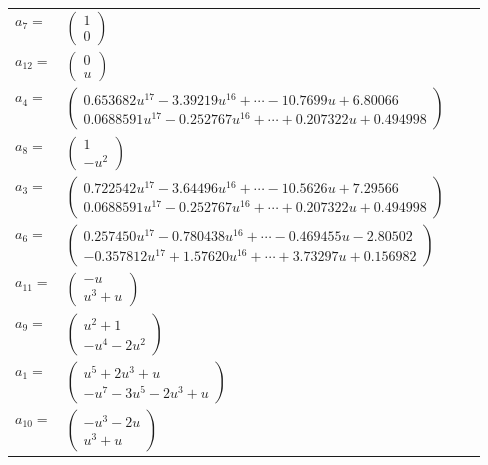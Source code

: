 \documentclass[1p]{elsarticle_modified}
\theoremstyle{definition}
\begin{document}
\begin{tabular}{m{7pt} m{180pt} m{7pt} m{180pt} }
\flushright $a_{7}=$&$\begin{pmatrix}1\\0\end{pmatrix}$ \\
\flushright $a_{12}=$&$\begin{pmatrix}0\\u\end{pmatrix}$ \\
\flushright $a_{4}=$&$\begin{pmatrix}0.653682 u^{17}-3.39219 u^{16}+\cdots-10.7699 u+6.80066\\0.0688591 u^{17}-0.252767 u^{16}+\cdots+0.207322 u+0.494998\end{pmatrix}$ \\
\flushright $a_{8}=$&$\begin{pmatrix}1\\- u^2\end{pmatrix}$ \\
\flushright $a_{3}=$&$\begin{pmatrix}0.722542 u^{17}-3.64496 u^{16}+\cdots-10.5626 u+7.29566\\0.0688591 u^{17}-0.252767 u^{16}+\cdots+0.207322 u+0.494998\end{pmatrix}$ \\
\flushright $a_{6}=$&$\begin{pmatrix}0.257450 u^{17}-0.780438 u^{16}+\cdots-0.469455 u-2.80502\\-0.357812 u^{17}+1.57620 u^{16}+\cdots+3.73297 u+0.156982\end{pmatrix}$ \\
\flushright $a_{11}=$&$\begin{pmatrix}- u\\u^3+u\end{pmatrix}$ \\
\flushright $a_{9}=$&$\begin{pmatrix}u^2+1\\- u^4-2 u^2\end{pmatrix}$ \\
\flushright $a_{1}=$&$\begin{pmatrix}u^5+2 u^3+u\\- u^7-3 u^5-2 u^3+u\end{pmatrix}$ \\
\flushright $a_{10}=$&$\begin{pmatrix}- u^3-2 u\\u^3+u\end{pmatrix}$ \\

\end{tabular}
\end{document}
